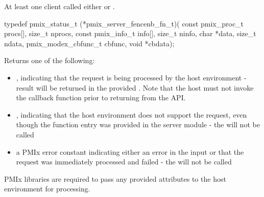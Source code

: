 \summary

At least one client called either  or .

\format

\cspecificstart
\begin{codepar}
typedef pmix_status_t (*pmix_server_fencenb_fn_t)(
                             const pmix_proc_t procs[],
                             size_t nprocs,
                             const pmix_info_t info[],
                             size_t ninfo,
                             char *data, size_t ndata,
                             pmix_modex_cbfunc_t cbfunc,
                             void *cbdata);
\end{codepar}
\cspecificend

\begin{arglist}
\end{arglist}

Returns one of the following:

\begin{itemize}
    \item {}, indicating that the request is being processed by the host environment - result will be returned in the provided . Note that the host must not invoke the callback function prior to returning from the \ac{API}.
    \item {}, indicating that the host environment does not support the request, even though the function entry was provided in the server module - the  will not be called
    \item a PMIx error constant indicating either an error in the input or that the request was immediately processed and failed - the  will not be called
\end{itemize}

\reqattrstart
\ac{PMIx} libraries are required to pass any provided attributes to the host environment for processing.

